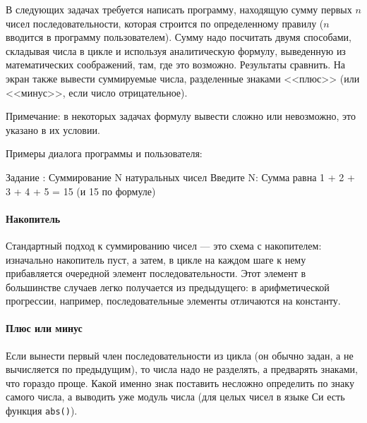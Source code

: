 
В следующих задачах требуется написать программу, находящую сумму первых $n$
чисел последовательности, которая строится по определенному правилу ($n$ вводится в программу
пользователем). Сумму надо посчитать двумя способами, складывая числа в цикле и
используя аналитическую формулу, выведенную из математических соображений, там, где это возможно.
Результаты сравнить. На экран также вывести
суммируемые числа, разделенные знаками <<плюс>> (или <<минус>>, если число
отрицательное).

Примечание: в некоторых задачах формулу вывести сложно или невозможно, это
указано в их условии.

Примеры диалога программы и пользователя:

\begin{zzoutput}
  Задание : Суммирование N натуральных чисел
  Введите N: 
  Сумма равна 1 + 2 + 3 + 4 + 5 = 15 (и 15 по формуле)
\end{zzoutput}


\zzsectionCOMMENTS

\paragraph{Накопитель}
Стандартный подход к суммированию чисел --- это схема с накопителем: изначально
накопитель пуст, а затем, в цикле на каждом шаге к нему прибавляется очередной
элемент последовательности. Этот элемент в большинстве случаев легко получается
из предыдущего: в арифметической прогрессии, например, последовательные элементы
отличаются на константу.

\paragraph{Плюс или минус}
Если вынести первый член последовательности из цикла (он обычно задан, а не
вычисляется по предыдущим), то числа надо не разделять, а предварять знаками,
что гораздо проще. Какой именно знак поставить несложно определить по знаку
самого числа, а выводить уже модуль числа (для целых чисел в языке Си есть
функция \texttt{abs()}).



